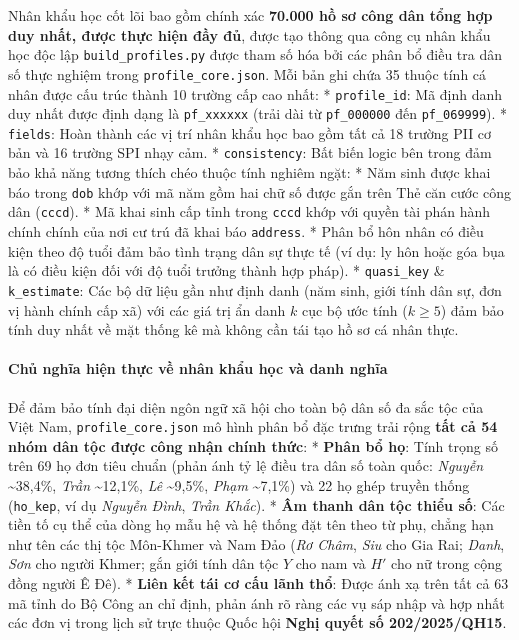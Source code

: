 \documentclass[
  11pt,
  a4paper,
]{article}
\begin{document}
Nhân khẩu học cốt lõi bao gồm chính xác \textbf{70.000 hồ sơ công dân
tổng hợp duy nhất, được thực hiện đầy đủ}, được tạo thông qua công cụ
nhân khẩu học độc lập \texttt{build\_profiles.py} được tham số hóa bởi
các phân bổ điều tra dân số thực nghiệm trong
\texttt{profile\_core.json}. Mỗi bản ghi chứa 35 thuộc tính cá nhân được
cấu trúc thành 10 trường cấp cao nhất: * \texttt{profile\_id}: Mã định
danh duy nhất được định dạng là \texttt{pf\_xxxxxx} (trải dài từ
\texttt{pf\_000000} đến \texttt{pf\_069999}). * \texttt{fields}: Hoàn
thành các vị trí nhân khẩu học bao gồm tất cả 18 trường PII cơ bản và 16
trường SPI nhạy cảm. * \texttt{consistency}: Bất biến logic bên trong
đảm bảo khả năng tương thích chéo thuộc tính nghiêm ngặt: * Năm sinh
được khai báo trong \texttt{dob} khớp với mã năm gồm hai chữ số được gắn
trên Thẻ căn cước công dân (\texttt{cccd}). * Mã khai sinh cấp tỉnh
trong \texttt{cccd} khớp với quyền tài phán hành chính chính của nơi cư
trú đã khai báo \texttt{address}. * Phân bổ hôn nhân có điều kiện theo
độ tuổi đảm bảo tình trạng dân sự thực tế (ví dụ: ly hôn hoặc góa bụa là
có điều kiện đối với độ tuổi trưởng thành hợp pháp). *
\texttt{quasi\_key} \& \texttt{k\_estimate}: Các bộ dữ liệu gần như định
danh (năm sinh, giới tính dân sự, đơn vị hành chính cấp xã) với các giá
trị ẩn danh \(k\) cục bộ ước tính (\(k \ge 5\)) đảm bảo tính duy nhất về
mặt thống kê mà không cần tái tạo hồ sơ cá nhân thực.

\paragraph{Chủ nghĩa hiện thực về nhân khẩu học và danh
nghĩa}\label{chux1ee7-nghux129a-hiux1ec7n-thux1ef1c-vux1ec1-nhuxe2n-khux1ea9u-hux1ecdc-vuxe0-danh-nghux129a}

Để đảm bảo tính đại diện ngôn ngữ xã hội cho toàn bộ dân số đa sắc tộc
của Việt Nam, \texttt{profile\_core.json} mô hình phân bổ đặc trưng trải
rộng \textbf{tất cả 54 nhóm dân tộc được công nhận chính thức}: *
\textbf{Phân bổ họ}: Tính trọng số trên 69 họ đơn tiêu chuẩn (phản ánh
tỷ lệ điều tra dân số toàn quốc: \emph{Nguyễn} \textasciitilde38,4\%,
\emph{Trần} \textasciitilde12,1\%, \emph{Lê} \textasciitilde9,5\%,
\emph{Phạm} \textasciitilde7,1\%) và 22 họ ghép truyền thống
(\texttt{ho\_kep}, ví dụ \emph{Nguyễn Đình}, \emph{Trần Khắc}). *
\textbf{Âm thanh dân tộc thiểu số}: Các tiền tố cụ thể của dòng họ mẫu
hệ và hệ thống đặt tên theo từ phụ, chẳng hạn như tên các thị tộc
Môn-Khmer và Nam Đảo (\emph{Rơ Châm}, \emph{Siu} cho Gia Rai;
\emph{Danh}, \emph{Sơn} cho người Khmer; gắn giới tính dân tộc \(Y\) cho
nam và \(H'\) cho nữ trong cộng đồng người Ê Đê). * \textbf{Liên kết tái
cơ cấu lãnh thổ}: Được ánh xạ trên tất cả 63 mã tỉnh do Bộ Công an chỉ
định, phản ánh rõ ràng các vụ sáp nhập và hợp nhất các đơn vị trong lịch
sử trực thuộc Quốc hội \textbf{Nghị quyết số 202/2025/QH15}.
\end{document}
